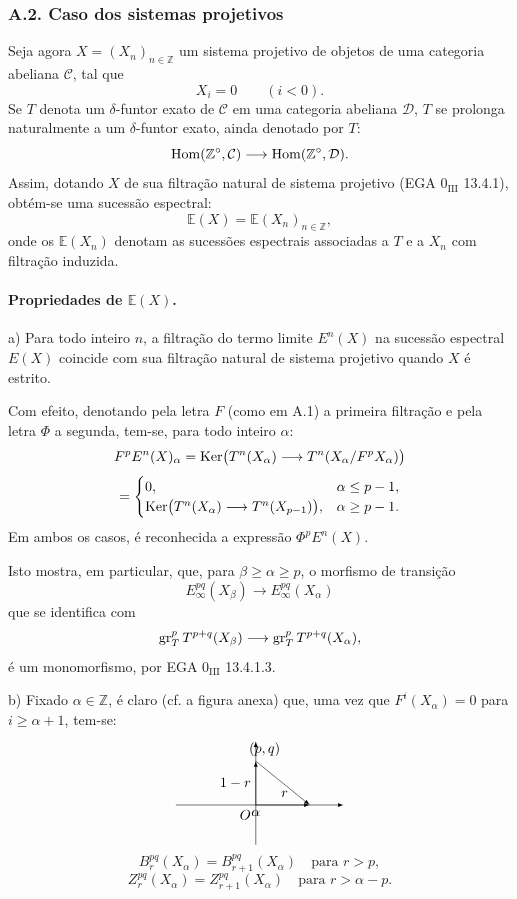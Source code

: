 \subsubsection*{A.2. Caso dos sistemas projetivos}
Seja agora \(X=(X_n)_{n\in\mathbb Z}\) um sistema projetivo de objetos de uma categoria abeliana \(\mathcal C\), tal que
\[
X_i=0\qquad(i<0).
\]
Se \(T\) denota um \(\delta\)-funtor exato de \(\mathcal C\) em uma categoria abeliana \(\mathcal D\), \(T\) se prolonga naturalmente a um \(\delta\)-funtor exato, ainda denotado por \(T\):
\[
\operatorname{Hom}(\mathbb Z^\circ,\mathcal C)\longrightarrow \operatorname{Hom}(\mathbb Z^\circ,\mathcal D).
\]
Assim, dotando \(X\) de sua filtração natural de sistema projetivo (EGA \(0_{\mathrm{III}}\) 13.4.1), obtém-se uma sucessão espectral:
\[
\mathbb E(X)=\mathbb E(X_n)_{n\in\mathbb Z},
\]
onde os \(\mathbb E(X_n)\) denotam as sucessões espectrais associadas a \(T\) e a \(X_n\) com filtração induzida.

\paragraph{Propriedades de \(\mathbb E(X)\).}
a) Para todo inteiro \(n\), a filtração do termo limite \(E^n(X)\) na sucessão espectral \(E(X)\) coincide com sua filtração natural de sistema projetivo quando \(X\) é estrito.

Com efeito, denotando pela letra \(F\) (como em A.1) a primeira filtração e pela letra \(\Phi\) a segunda, tem-se, para todo inteiro \(\alpha\):
\[
F^pE^n(X)_\alpha
=\operatorname{Ker}\bigl(T^n(X_\alpha)\longrightarrow T^n(X_\alpha/F^pX_\alpha)\bigr)
\]
\[
=
\begin{cases}
0,& \alpha\le p-1,\\
\operatorname{Ker}\bigl(T^n(X_\alpha)\longrightarrow T^n(X_{p-1})\bigr),& \alpha\ge p-1.
\end{cases}
\]
Em ambos os casos, é reconhecida a expressão \(\Phi^pE^n(X)\).

Isto mostra, em particular, que, para \(\beta\ge\alpha\ge p\), o morfismo de transição
\[
E_\infty^{pq}(X_\beta)\longrightarrow E_\infty^{pq}(X_\alpha)
\]
que se identifica com
\[
\operatorname{gr}_T^pT^{p+q}(X_\beta)\longrightarrow
\operatorname{gr}_T^pT^{p+q}(X_\alpha),
\]
é um monomorfismo, por EGA \(0_{\mathrm{III}}\) 13.4.1.3.

b) Fixado \(\alpha\in\mathbb Z\), é claro (cf. a figura anexa) que, uma vez que \(F^i(X_\alpha)=0\) para \(i\ge\alpha+1\), tem-se:
\[
\begin{tikzpicture}[baseline=(current bounding box.center),x=1.0cm,y=1.0cm,>=latex]
\draw[->] (-2.0,0) -- (2.2,0);
\draw[->] (0,-1.0) -- (0,1.6);
\node[below left] at (0,0) {$O$};
\node[below] at (0,0) {$\alpha$};
\draw[->] (0,0) -- (0,1.1);
\draw[->] (0,1.1) -- (1.35,0);
\draw[->] (0,0) -- (1.35,0);
\node[above] at (.22,1.1) {$(p,q)$};
\node[left] at (0,0.55) {$1-r$};
\node[above] at (.72,0.08) {$r$};
\end{tikzpicture}
\]
\[
B_r^{pq}(X_\alpha)=B_{r+1}^{pq}(X_\alpha)\quad\text{para }r>p,
\]
\[
Z_r^{pq}(X_\alpha)=Z_{r+1}^{pq}(X_\alpha)\quad\text{para }r>\alpha-p.
\]
